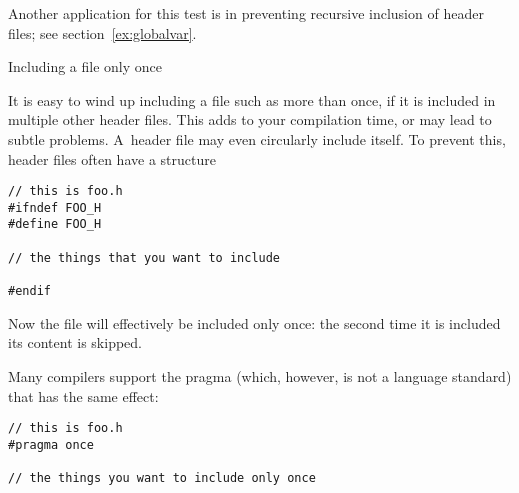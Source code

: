 Another application for this test is in preventing recursive inclusion
of header files; see section~\ref{ex:globalvar}.


 {Including a file only once}

It is easy to wind up including a file such as  more than
once, if it is included in multiple other header files. This adds to
your compilation time, or may lead to subtle problems. A~header file
may even circularly include itself. To prevent this, header files
often have a structure%
\begin{verbatim}
// this is foo.h
#ifndef FOO_H
#define FOO_H

// the things that you want to include

#endif
\end{verbatim}
Now the file will effectively be included only once: the second time
it is included its content is skipped.

Many compilers support the pragma
%
(which, however, is not a language standard) that has the same
effect:
\begin{verbatim}
// this is foo.h
#pragma once

// the things you want to include only once
\end{verbatim}
